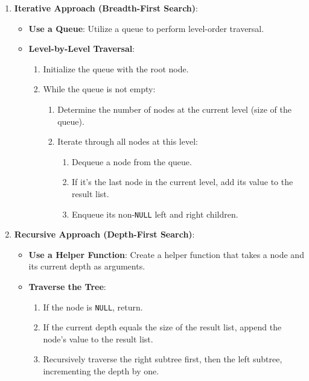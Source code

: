 \begin{enumerate}
    \item \textbf{Iterative Approach (Breadth-First Search)}:
    \begin{itemize}
        \item \textbf{Use a Queue}: Utilize a queue to perform level-order traversal.
        \item \textbf{Level-by-Level Traversal}:
        \begin{enumerate}
            \item Initialize the queue with the root node.
            \item While the queue is not empty:
            \begin{enumerate}
                \item Determine the number of nodes at the current level (size of the queue).
                \item Iterate through all nodes at this level:
                \begin{enumerate}
                    \item Dequeue a node from the queue.
                    \item If it's the last node in the current level, add its value to the result list.
                    \item Enqueue its non-\texttt{NULL} left and right children.
                \end{enumerate}
            \end{enumerate}
        \end{enumerate}
    \end{itemize}
    
    \item \textbf{Recursive Approach (Depth-First Search)}:
    \begin{itemize}
        \item \textbf{Use a Helper Function}: Create a helper function that takes a node and its current depth as arguments.
        \item \textbf{Traverse the Tree}:
        \begin{enumerate}
            \item If the node is \texttt{NULL}, return.
            \item If the current depth equals the size of the result list, append the node's value to the result list.
            \item Recursively traverse the right subtree first, then the left subtree, incrementing the depth by one.
        \end{enumerate}
    \end{itemize}
\end{enumerate}

